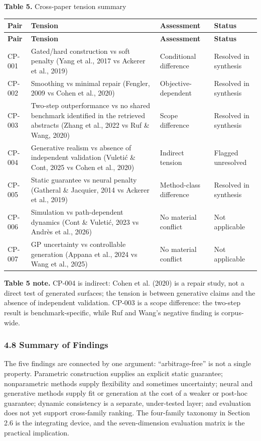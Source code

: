 \documentclass[11pt]{article}
\begin{document}
\textbf{Table 5.} Cross-paper tension summary

\begingroup
\begin{longtable}{@{}p{}p{}p{}p{}@{}}
\toprule
\textbf{Pair} & \textbf{Tension} & \textbf{Assessment} & \textbf{Status} \\
\midrule
\endfirsthead
\toprule
\textbf{Pair} & \textbf{Tension} & \textbf{Assessment} & \textbf{Status} \\
\midrule
\endhead
CP-001 & Gated/hard construction vs soft penalty (Yang et al., 2017 vs Ackerer et al., 2019) & Conditional difference & Resolved in synthesis \\
CP-002 & Smoothing vs minimal repair (Fengler, 2009 vs Cohen et al., 2020) & Objective-dependent & Resolved in synthesis \\
CP-003 & Two-step outperformance vs no shared benchmark identified in the retrieved abstracts (Zhang et al., 2022 vs Ruf \& Wang, 2020) & Scope difference & Resolved in synthesis \\
CP-004 & Generative realism vs absence of independent validation (Vuletić \& Cont, 2025 vs Cohen et al., 2020) & Indirect tension & Flagged unresolved \\
CP-005 & Static guarantee vs neural penalty (Gatheral \& Jacquier, 2014 vs Ackerer et al., 2019) & Method-class difference & Resolved in synthesis \\
CP-006 & Simulation vs path-dependent dynamics (Cont \& Vuletić, 2023 vs Andrès et al., 2026) & No material conflict & Not applicable \\
CP-007 & GP uncertainty vs controllable generation (Appana et al., 2024 vs Wang et al., 2025) & No material conflict & Not applicable \\
\bottomrule
\end{longtable}
\endgroup

\textbf{Table 5 note.} CP-004 is indirect: Cohen et al. (2020) is a repair study, not a direct test of generated surfaces; the tension is between generative claims and the absence of independent validation. CP-003 is a scope difference: the two-step result is benchmark-specific, while Ruf and Wang’s negative finding is corpus-wide.

\subsubsection*{4.8 Summary of Findings}
The five findings are connected by one argument: “arbitrage-free” is not a single property. Parametric construction supplies an explicit static guarantee; nonparametric methods supply flexibility and sometimes uncertainty; neural and generative methods supply fit or generation at the cost of a weaker or post-hoc guarantee; dynamic consistency is a separate, under-tested layer; and evaluation does not yet support cross-family ranking. The four-family taxonomy in Section 2.6 is the integrating device, and the seven-dimension evaluation matrix is the practical implication.
\end{document}
